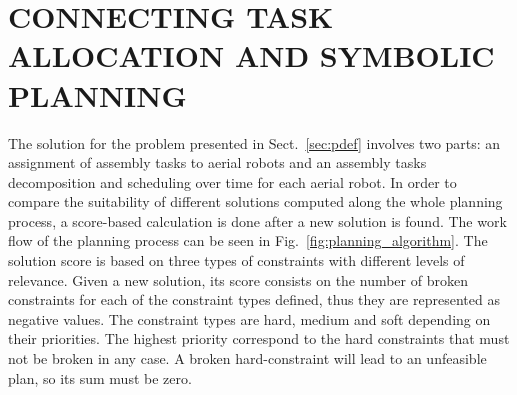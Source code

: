 \documentclass[letterpaper, 10 pt, conference]{ieeeconf}  %
\begin{document}
\section{CONNECTING TASK ALLOCATION AND SYMBOLIC PLANNING}
	\label{sec:score_calc}

The solution for the problem presented in Sect.~\ref{sec:pdef} involves two parts: an assignment of assembly tasks to aerial robots and an assembly tasks decomposition and scheduling over time for each aerial robot. In order to compare the suitability of different solutions computed along the whole planning process, a score-based calculation is done after a new solution is found. The work flow of the planning process can be seen in Fig.~\ref{fig:planning_algorithm}. The solution score is based on three types of constraints with different levels of relevance. Given a new solution, its score consists on the number of broken constraints for each of the constraint types defined, thus they are represented as negative values. The constraint types are hard, medium and soft depending on their priorities. The highest priority correspond to the hard constraints that must not be broken in any case. A broken hard-constraint will lead to an unfeasible plan, so its sum must be zero.

    
\end{document}
